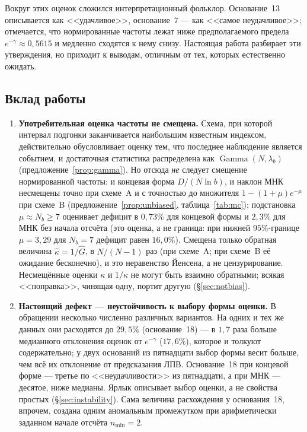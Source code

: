 \documentclass[11pt,a4paper]{article}
\theoremstyle{plain}
\theoremstyle{remark}
\newcommand{\emg}{e^{-\gamma}}
\DeclareMathOperator{\Gam}{Gamma}
\begin{document}
Вокруг этих оценок сложился интерпретационный фольклор. Основание~13 описывается как
<<удачливое>>, основание~7 --- как <<самое неудачливое>>; отмечается, что нормированные
частоты лежат ниже предполагаемого предела $\emg\approx0{,}5615$ и медленно сходятся
к нему снизу. Настоящая работа разбирает эти утверждения, но приходит к выводам,
отличным от тех, которых естественно ожидать.

\subsection{Вклад работы}

\begin{enumerate}
\item\textbf{Употребительная оценка частоты не смещена.} Схема, при которой интервал
подгонки заканчивается наибольшим известным индексом, действительно обусловливает
оценку тем, что последнее наблюдение является событием, и достаточная статистика
распределена как $\Gam(N,\lambda_b)$ (предложение~\ref{prop:gamma}). Но отсюда
\emph{не} следует смещение нормированной частоты: и концевая форма
$D/(N\ln b)$, и наклон МНК несмещены точно при схеме~A и с точностью до
множителя $1-(1+\mu)e^{-\mu}$ при схеме~B (предложение~\ref{prop:unbiased},
таблица~\ref{tab:mc}); подстановка $\mu\approx N_b\ge7$ оценивает дефицит в
$0{,}73\%$ для концевой формы и $2{,}3\%$ для МНК без начала отсчёта (это оценка,
а не граница: при нижней $95\%$-границе $\mu=3{,}29$ для $N_b=7$ дефицит равен
$16{,}0\%$).
Смещена только обратная величина
$\hat\kappa=1/\hat G$, в $N/(N-1)$ раз (при схеме~A; при схеме~B её ожидание
бесконечно), и это неравенство Йенсена, а не цензурирование.
Несмещённые оценки $\kappa$ и $1/\kappa$ не могут быть взаимно обратными; всякая
<<поправка>>, чинящая одну, портит другую (\S\ref{sec:notbias}).

\item\textbf{Настоящий дефект --- неустойчивость к выбору формы оценки.}
В обращении несколько численно различных вариантов. На одних и тех же данных они
расходятся до $29{,}5\%$ (основание~18) --- в $1{,}7$ раза больше медианного
отклонения оценок от $\emg$ ($17{,}6\%$), которое и толкуют содержательно; у двух
оснований из пятнадцати выбор формы весит больше, чем всё их отклонение от
предсказания ЛПВ. Основание~18 при концевой форме --- третье
по <<неудачливости>> из пятнадцати, а при МНК --- десятое, ниже медианы. Ярлык
описывает выбор оценки, а не свойства простых (\S\ref{sec:instability}). Сама
величина расхождения у основания~18, впрочем, создана одним аномальным
промежутком при арифметически заданном начале отсчёта $n_{\min}=2$.


\end{enumerate}
\end{document}
